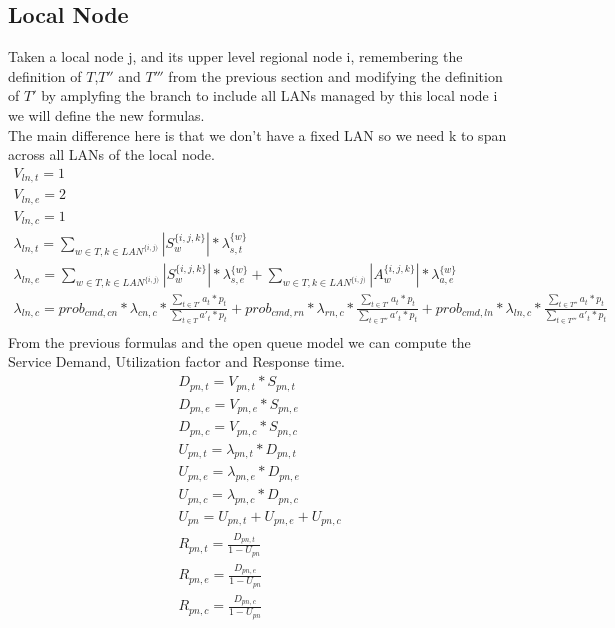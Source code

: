 \documentclass[11pt]{article}
\begin{document}
\subsection{Local Node}
Taken a local node j, and its upper level regional node i, remembering the definition of $T$,$T''$ and $T'''$ from the previous section and modifying the definition of $T'$ by amplyfing the branch to include all LANs managed by this local node i we will define the new formulas.\\
The main difference here is that we don't have a fixed LAN so we need k to span across all LANs of the local node.
\begin{equation}
    \begin{array}{l}
        V_{ln, t} = 1 \\
        V_{ln, e} = 2 \\ %
        V_{ln,c} = 1 \\
        \lambda_{ln, t} = \sum\limits_{w \in T,k \in LAN^{\{i,j)}}{| S^{\{i,j,k\}}_{w} | * \lambda^{\{w\}}_{s, t}}  \\
        \lambda_{ln, e} = \sum\limits_{w \in T,k \in LAN^{\{i,j)}}{| S^{\{i,j,k\}}_{w} | * \lambda^{\{w\}}_{s, e}} + \sum\limits_{w \in T,k \in LAN^{\{i,j)}}{| A^{\{i,j,k\}}_{w} | * \lambda^{\{w\}}_{a, e}}\\
		\lambda_{ln, c} = prob_{cmd,cn} * \lambda_{cn, c} * \frac{\sum\limits_{t \in T'}{a_{t} * p_{t}}}{\sum\limits_{t \in T}{a'_{t} * p_{t}}} + prob_{cmd,rn} * \lambda_{rn, c} *\frac{\sum\limits_{t \in T'}{a_{t} * p_{t}}}{\sum\limits_{t \in T''}{a'_{t} * p_{t}}}  + prob_{cmd,ln} * \lambda_{ln, c} * \frac{\sum\limits_{t \in T''}{a_{t} * p_{t}}}{\sum\limits_{t \in T'''}{a'_{t} * p_{t}}}  \\\

    \end{array}
\end{equation}
From the previous formulas and the open queue model we can compute the Service Demand, Utilization factor and Response time.
\begin{equation}
    \begin{array}{l}
        D_{pn, t} = V_{pn, t} * S_{pn, t} \\
        D_{pn, e} = V_{pn, e} * S_{pn, e} \\
        D_{pn, c} = V_{pn, c} * S_{pn, c} \\
        U_{pn, t} = \lambda_{pn, t} * D_{pn, t} \\
        U_{pn, e} = \lambda_{pn, e} * D_{pn, e} \\
        U_{pn, c} = \lambda_{pn, c} * D_{pn, c} \\
        U_{pn} = U_{pn, t} + U_{pn, e} + U_{pn, c} \\
        R_{pn, t} = \frac{D_{pn, t}}{1 - U_{pn}} \\
        R_{pn, e} = \frac{D_{pn, e}}{1 - U_{pn}} \\
        R_{pn, c} = \frac{D_{pn, c}}{1 - U_{pn}} \\
    \end{array}
\end{equation}
\end{document}
